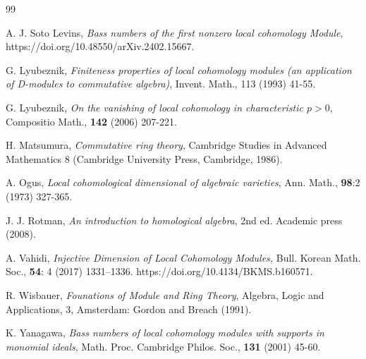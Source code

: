 \documentclass[12pt,twoside, final]{amsart}
\numberwithin{equation}{section}
\newtheorem{nota rem}[thm]{Notation and Remark}
\newtheorem{defen rem}[thm]{Definition and Remark}
\begin{document}
\begin{thebibliography}{99}
 

 A. J. Soto Levins, {\em Bass numbers of the first nonzero local cohomology
Module}, https://doi.org/10.48550/arXiv.2402.15667.


G. Lyubeznik, {\em Finiteness properties of local cohomology modules (an application of D-modules to
commutative algebra)}, Invent. Math., 113 (1993)  41-55.

 G. Lyubeznik, {\em On the vanishing of local cohomology in characteristic $p> 0$}, Compositio Math., {\bf142} (2006) 207-221.

H. Matsumura, {\em Commutative ring theory}, Cambridge Studies in Advanced
Mathematics 8 (Cambridge University Press, Cambridge, 1986).

A. Ogus, {\em Local cohomological dimensional of algebraic varieties}, Ann. Math., {\bf 98}:2
(1973) 327-365.

J. J. Rotman, {\em An introduction to homological algebra}, 2nd ed. Academic press (2008).


 A. Vahidi, {\em Injective Dimension of
Local Cohomology Modules,} Bull. Korean Math. Soc., \textbf{54}: 4 (2017)  1331–1336.
https://doi.org/10.4134/BKMS.b160571.


 R. Wisbauer, {\em Founations of Module and Ring Theory}, Algebra, Logic and Applications, 3,
Amsterdam: Gordon and Breach (1991).

 K. Yanagawa, {\em Bass numbers of local cohomology modules with supports in monomial ideals}, Math. Proc.
Cambridge Philos. Soc., {\bf131} (2001) 45-60.
\end{thebibliography}
\end{document}
